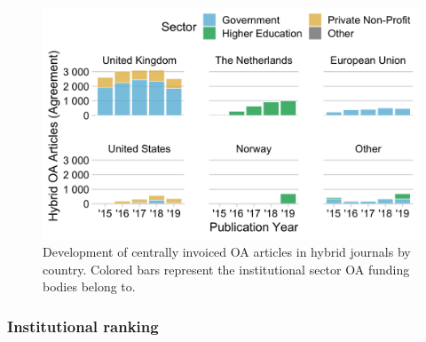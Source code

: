 \documentclass[a4paper,man,floatsintext,longtable,noextraspace,12pt]{apa6}
\begin{document}
\begin{figure}[H]

{\centering \includegraphics[width=0.7\linewidth,]{manuscript_files/figure-latex/sponsor_sector-1} 

}

\caption{ Development of centrally invoiced OA articles in hybrid journals by country. Colored bars represent the institutional sector OA funding bodies belong to.}\label{fig:sponsor_sector}
\end{figure}

\begin{table}

\caption{\label{tab:subject_profile} Relative subject profile of centrally invoiced OA funding bodies.}
\centering
{}
\end{table}

\hypertarget{institutional-ranking}{%
\subsubsection*{Institutional ranking}\label{institutional-ranking}}
\end{document}
